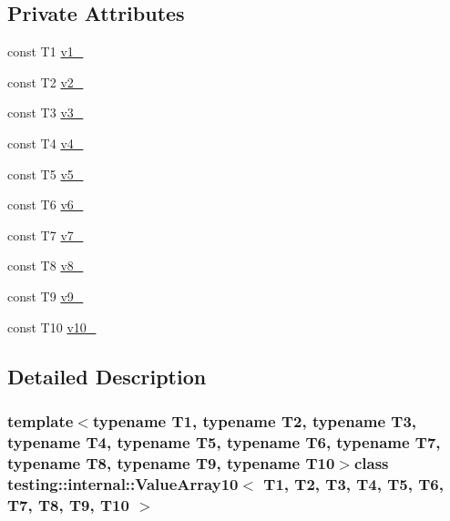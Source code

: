 \subsection*{\-Private \-Attributes}
\begin{DoxyCompactItemize}
\item 
const \-T1 \hyperlink{classtesting_1_1internal_1_1ValueArray10_aac1d0654cc6c1aceb4a5d0fa7a98042e}{v1\-\_\-}
\item 
const \-T2 \hyperlink{classtesting_1_1internal_1_1ValueArray10_a9f0a8ce6ce2fd27e980c4c51a7a7256a}{v2\-\_\-}
\item 
const \-T3 \hyperlink{classtesting_1_1internal_1_1ValueArray10_a4f8257321a2eab0456239174d6712d5e}{v3\-\_\-}
\item 
const \-T4 \hyperlink{classtesting_1_1internal_1_1ValueArray10_aac184059fee257381ccae81d8d112f85}{v4\-\_\-}
\item 
const \-T5 \hyperlink{classtesting_1_1internal_1_1ValueArray10_a1f3e0ada8419ed2e17cc61e6c0c54404}{v5\-\_\-}
\item 
const \-T6 \hyperlink{classtesting_1_1internal_1_1ValueArray10_a13d84d5824617bbc6fb1a6b3ee3cb745}{v6\-\_\-}
\item 
const \-T7 \hyperlink{classtesting_1_1internal_1_1ValueArray10_a4063f0b7a528133d018ee488ba44a9a3}{v7\-\_\-}
\item 
const \-T8 \hyperlink{classtesting_1_1internal_1_1ValueArray10_a596bc5260b2474271d1f6910ff6f665d}{v8\-\_\-}
\item 
const \-T9 \hyperlink{classtesting_1_1internal_1_1ValueArray10_a6356e16cf54a9dfac8525f20242af31e}{v9\-\_\-}
\item 
const \-T10 \hyperlink{classtesting_1_1internal_1_1ValueArray10_a147ca4457ea439b00a93087231ff77ef}{v10\-\_\-}
\end{DoxyCompactItemize}


\subsection{\-Detailed \-Description}
\subsubsection*{template$<$typename \-T1, typename \-T2, typename \-T3, typename \-T4, typename \-T5, typename \-T6, typename \-T7, typename \-T8, typename \-T9, typename \-T10$>$class testing\-::internal\-::\-Value\-Array10$<$ T1, T2, T3, T4, T5, T6, T7, T8, T9, T10 $>$}



